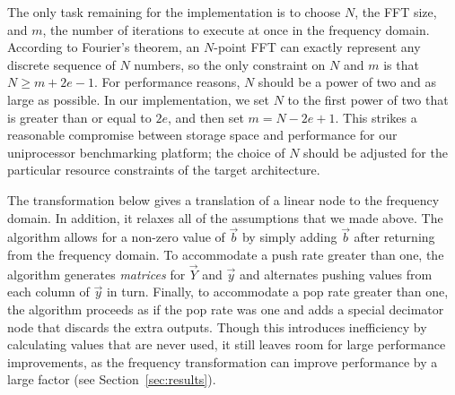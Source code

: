 \documentclass{sig-alternate}
\begin{document}
{The only task remaining for the implementation is to choose $N$, the
FFT size, and $m$, the number of iterations to execute at once in the
frequency domain.  According to Fourier's theorem, an $N$-point FFT
can exactly represent any discrete sequence of $N$ numbers, so the
only constraint on $N$ and $m$ is that $N \ge m+2e-1$.  For
performance reasons, $N$ should be a power of two and as large as
possible.  In our implementation, we set $N$ to the first power of two
that is greater than or equal to $2e$, and then set $m = N-2e+1$.
This strikes a reasonable compromise between storage space and
performance for our uniprocessor benchmarking platform; the choice of
$N$ should be adjusted for the particular resource constraints of the
target architecture.

The transformation below gives a {\naive} translation of a linear node
to the frequency domain.  In addition, it relaxes all of the
assumptions that we made above.  The algorithm allows for a non-zero
value of ${\vec b}$ by simply adding $\vec{b}$ after returning from
the frequency domain.  To accommodate a push rate greater than one,
the algorithm generates {\it matrices} for $\vec{Y}$ and $\vec{y}$ and
alternates pushing values from each column of $\vec{y}$ in turn.
Finally, to accommodate a pop rate greater than one, the algorithm
proceeds as if the pop rate was one and adds a special decimator node
that discards the extra outputs.  Though this introduces inefficiency
by calculating values that are never used, it still leaves room for
large performance improvements, as the frequency transformation can
improve performance by a large factor (see Section~\ref{sec:results}).

}
\end{document}
